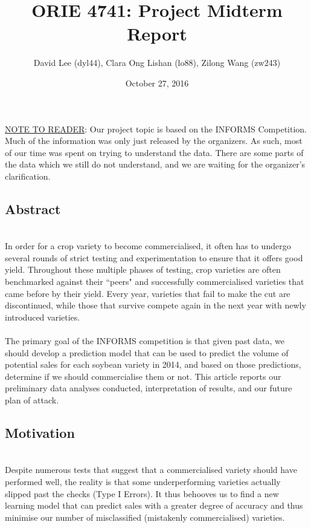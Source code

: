 \documentclass[psamsfonts]{amsart}
\title{ORIE 4741: Project Midterm Report}
\author{David Lee (dyl44), Clara Ong Lishan (lo88), Zilong Wang (zw243)}
\date{October 27, 2016}
\begin{document}
\maketitle

\underline{NOTE TO READER}: Our project topic is based on the INFORMS Competition. Much of the information was only just released by the organizers. As such, most of our time was spent on trying to understand the data. There are some parts of the data which we still do not understand, and we are waiting for the organizer's clarification. 

\subsection*{Abstract}
\hfill \\

In order for a crop variety to become commercialised, it often has to undergo several rounds of strict testing and experimentation to ensure that it offers good yield. Throughout these multiple phases of testing, crop varieties are often benchmarked against their ``peers" and successfully commercialised varieties that came before by their yield. Every year, varieties that fail to make the cut are discontinued, while those that survive compete again in the next year with newly introduced varieties.\\
\\
 The primary goal of the INFORMS competition is that given past data, we should develop a prediction model that can be used to predict the volume of potential sales for each soybean variety in 2014, and based on those predictions, determine if we should commercialise them or not. This article reports our preliminary data analyses conducted, interpretation of results, and our future plan of attack. \\


\subsection*{Motivation}
\hfill \\

 Despite numerous tests that suggest that a commercialised variety should have performed well, the reality is that some underperforming varieties actually slipped past the checks (Type I Errors). It thus behooves us to find a new learning model that can predict sales with a greater degree of accuracy and thus minimise our number of misclassified (mistakenly commercialised) varieties.\\
\end{document}
